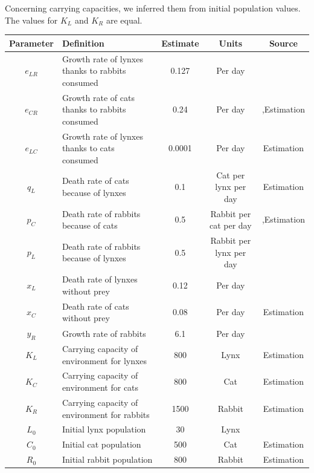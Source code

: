 \documentclass[12pt]{article}
\begin{document}
\quad Concerning carrying capacities, we inferred them from initial population values. The values for $K_{L}$ and $K_{R}$ are equal.

\begin{tabular}{|c|p{4cm}|c|c|c|}
	
	\hline
	Parameter & Definition & Estimate & Units & Source \\
	\hline
	$e_{LR}$ & Growth rate of lynxes thanks to rabbits consumed & 0.127 & Per day & \cite{wave_of_chaos} \\
	\hline
	$e_{CR}$ & Growth rate of cats thanks to rabbits consumed & 0.24 & Per day & \cite{soucy_cats_2017},Estimation \\
	\hline
	$e_{LC}$ & Growth rate of lynxes thanks to cats consumed & 0.0001 & Per day & Estimation \\
	\hline
	$q_{L}$ & Death rate of cats because of lynxes & 0.1 & Cat per lynx per day & Estimation \\
	\hline
	$p_{C}$ & Death rate of rabbits because of cats & 0.5 & Rabbit per cat per day & \cite{soucy_cats_2017},Estimation \\
	\hline
	$p_{L}$ & Death rate of rabbits because of lynxes & 0.5 & Rabbit per lynx per day & \cite{wave_of_chaos} \\
	\hline
	$x_{L}$ & Death rate of lynxes without prey & 0.12 & Per day & \cite{wave_of_chaos} \\
	\hline
	$x_{C}$ & Death rate of cats without prey & 0.08 & Per day & Estimation\\
	\hline
	$y_{R}$ & Growth rate of rabbits & 6.1 & Per day & \cite{wave_of_chaos} \\
	\hline
	$K_{L}$ & Carrying capacity of environment for lynxes & 800 & Lynx & Estimation \\
	\hline
	$K_{C}$ & Carrying capacity of environment for cats & 800 & Cat & Estimation \\
	\hline
	$K_{R}$ & Carrying capacity of environment for rabbits & 1500 & Rabbit & Estimation \\
	\hline
	$L_{0}$ & Initial lynx population & 30 & Lynx & \cite{meli_feline_2010} \\
	\hline
	$C_{0}$ & Initial cat population & 500 & Cat & Estimation \\
	\hline
	$R_{0}$ & Initial rabbit population & 800 & Rabbit & Estimation \\
	\hline
\end{tabular}	\\\\
\end{document}
